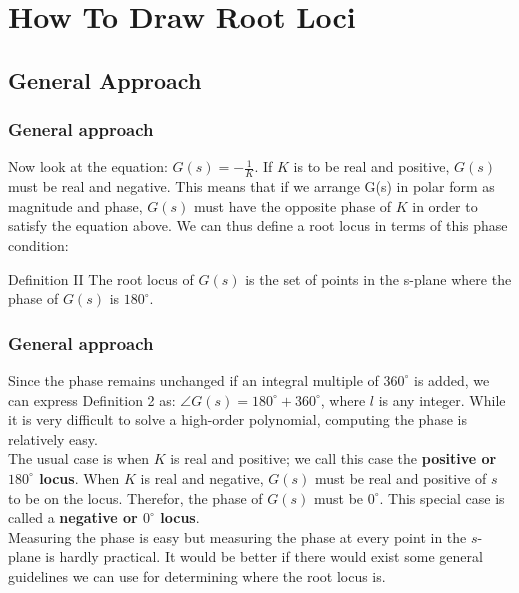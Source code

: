 \section{How To Draw Root Loci}

\subsection{General Approach}

\begin{frame}
\frametitle{General approach}
	Now look at the equation: $G(s) = -\frac{1}{K}$. If $K$ is to be real and positive, $G(s)$ must be real and negative. This means that if we arrange G(s) in polar form as magnitude and phase, $G(s)$ must have the opposite phase of $K$ in order to satisfy the equation above. We can thus define a root locus in terms of this phase condition:  
	\vspace{0.5em}
	\begin{block}{Definition II}
		The root locus of $G(s)$ is the set of points in the s-plane where the phase of $G(s)$ is $180^{\circ}$.	
	\end{block}
	
\end{frame}

\begin{frame}
\frametitle{General approach}
	Since the phase remains unchanged if an integral multiple of $360^{\circ}$ is added, we can express Definition 2 as: $\angle G(s) = 180^{\circ} + 360^{\circ}$, where $l$ is any integer. While it is very difficult to solve a high-order polynomial, computing the phase is relatively easy.\\
	\vspace{1em}
	The usual case is when $K$ is real and positive; we call this case the \textbf{positive or $180^{\circ}$ locus}. When $K$ is real and negative, $G(s)$ must be real and positive of $s$ to be on the locus. Therefor, the phase of $G(s)$ must be $0^{\circ}$. This special case is called a \textbf{negative or $0^{\circ}$ locus}.\\
	\vspace{1em}
	Measuring the phase is easy but measuring the phase at every point in the $s$-plane is hardly practical. It would be better if there would exist some general guidelines we can use for determining where the root locus is.
\end{frame}

